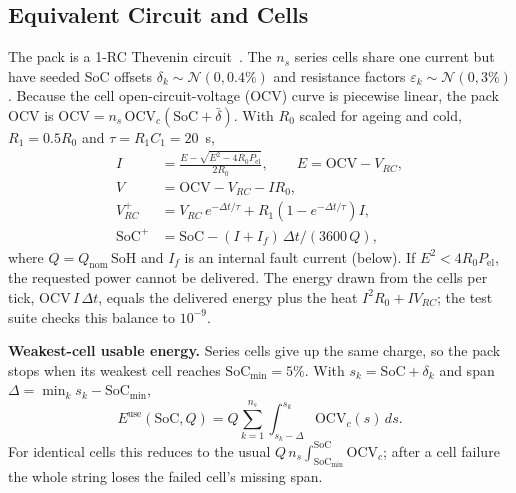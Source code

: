 \documentclass[journal]{IEEEtran}
\begin{document}
\subsection{Equivalent Circuit and Cells}
The pack is a 1-RC Thevenin circuit~\cite{plett2015bms}. The $n_s$ series cells share one current but have seeded SoC offsets $\delta_k \sim \mathcal{N}(0, 0.4\%)$ and resistance factors $\varepsilon_k \sim \mathcal{N}(0, 3\%)$. Because the cell open-circuit-voltage (OCV) curve is piecewise linear, the pack OCV is $\mathrm{OCV} = n_s\, \mathrm{OCV}_c(\mathrm{SoC} + \bar\delta)$. With $R_0$ scaled for ageing and cold, $R_1 = 0.5 R_0$ and $\tau = R_1 C_1 = 20$~s,
\begin{align}
I &= \frac{E - \sqrt{E^2 - 4 R_0 P_{\mathrm{el}}}}{2R_0},\qquad E = \mathrm{OCV} - V_{RC},\\
V &= \mathrm{OCV} - V_{RC} - I R_0,\\
V_{RC}^{+} &= V_{RC}\,e^{-\Delta t/\tau} + R_1 (1 - e^{-\Delta t/\tau}) I,\\
\mathrm{SoC}^{+} &= \mathrm{SoC} - (I + I_f)\,\Delta t / (3600\, Q),
\end{align}
where $Q = Q_{\mathrm{nom}}\,\mathrm{SoH}$ and $I_f$ is an internal fault current (below). If $E^2 < 4R_0P_{\mathrm{el}}$, the requested power cannot be delivered. The energy drawn from the cells per tick, $\mathrm{OCV}\, I\, \Delta t$, equals the delivered energy plus the heat $I^2 R_0 + I V_{RC}$; the test suite checks this balance to $10^{-9}$.

\textbf{Weakest-cell usable energy.} Series cells give up the same charge, so the pack stops when its weakest cell reaches $\mathrm{SoC}_{\min} = 5\%$. With $s_k = \mathrm{SoC} + \delta_k$ and span $\Delta = \min_k s_k - \mathrm{SoC}_{\min}$,
\begin{equation}
E^{\mathrm{use}}(\mathrm{SoC}, Q) = Q \sum_{k=1}^{n_s} \int_{s_k - \Delta}^{s_k} \mathrm{OCV}_c(s)\, ds .
\label{eq:usable}
\end{equation}
For identical cells this reduces to the usual $Q\, n_s \int_{\mathrm{SoC}_{\min}}^{\mathrm{SoC}} \mathrm{OCV}_c$; after a cell failure the whole string loses the failed cell's missing span.
\end{document}
